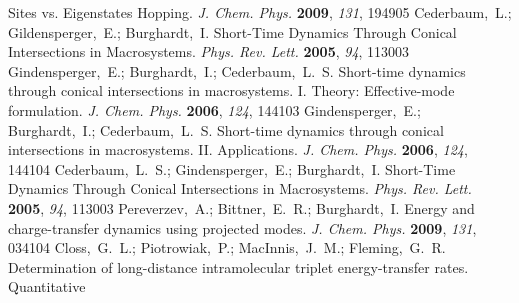 \begin{mcitethebibliography}{27}
Sites vs. Eigenstates Hopping. \emph{J. Chem.
  Phys.} \textbf{2009}, \emph{131}, 194905\relax
\mciteBstWouldAddEndPuncttrue
\mciteSetBstMidEndSepPunct{\mcitedefaultmidpunct}
{\mcitedefaultendpunct}{\mcitedefaultseppunct}\relax
\EndOfBibitem
{}
Cederbaum,~L.; Gildensperger,~E.; Burghardt,~I. Short-Time Dynamics Through
  Conical Intersections in Macrosystems. \emph{Phys. Rev. Lett.} \textbf{2005},
  \emph{94}, 113003\relax
\mciteBstWouldAddEndPuncttrue
\mciteSetBstMidEndSepPunct{\mcitedefaultmidpunct}
{\mcitedefaultendpunct}{\mcitedefaultseppunct}\relax
\EndOfBibitem
{}
Gindensperger,~E.; Burghardt,~I.; Cederbaum,~L.~S. Short-time dynamics through
  conical intersections in macrosystems. I. Theory: Effective-mode formulation.
  \emph{J. Chem. Phys.} \textbf{2006}, \emph{124},
  144103\relax
\mciteBstWouldAddEndPuncttrue
\mciteSetBstMidEndSepPunct{\mcitedefaultmidpunct}
{\mcitedefaultendpunct}{\mcitedefaultseppunct}\relax
\EndOfBibitem
{}
Gindensperger,~E.; Burghardt,~I.; Cederbaum,~L.~S. Short-time dynamics through
  conical intersections in macrosystems. II. Applications. \emph{J. Chem. Phys.} \textbf{2006}, \emph{124}, 144104\relax
\mciteBstWouldAddEndPuncttrue
\mciteSetBstMidEndSepPunct{\mcitedefaultmidpunct}
{\mcitedefaultendpunct}{\mcitedefaultseppunct}\relax
\EndOfBibitem
{}
Cederbaum,~L.~S.; Gindensperger,~E.; Burghardt,~I. Short-Time Dynamics Through
  Conical Intersections in Macrosystems. \emph{Phys. Rev. Lett.} \textbf{2005},
  \emph{94}, 113003\relax
\mciteBstWouldAddEndPuncttrue
\mciteSetBstMidEndSepPunct{\mcitedefaultmidpunct}
{\mcitedefaultendpunct}{\mcitedefaultseppunct}\relax
\EndOfBibitem
{}
Pereverzev,~A.; Bittner,~E.~R.; Burghardt,~I. Energy and charge-transfer
  dynamics using projected modes. \emph{J. Chem. Phys.}
  \textbf{2009}, \emph{131}, 034104\relax
\mciteBstWouldAddEndPuncttrue
\mciteSetBstMidEndSepPunct{\mcitedefaultmidpunct}
{\mcitedefaultendpunct}{\mcitedefaultseppunct}\relax
\EndOfBibitem
{}
Closs,~G.~L.; Piotrowiak,~P.; MacInnis,~J.~M.; Fleming,~G.~R. Determination of
  long-distance intramolecular triplet energy-transfer rates. Quantitative

\end{mcitethebibliography}
